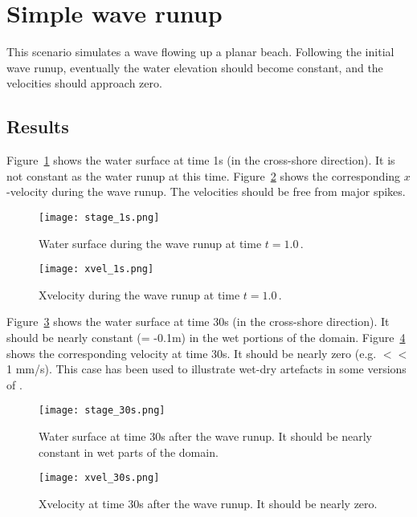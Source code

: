 \section{Simple wave runup}
This scenario simulates a wave flowing up a planar beach. Following the initial wave runup, eventually the water elevation should become constant, and the velocities should approach zero. 

\subsection{Results}
Figure~\ref{fig:stage_1s} shows the water surface at time 1s (in the cross-shore direction). It is not constant as the water runup at this time. Figure~\ref{fig:xvel_1s} shows the corresponding $x$-velocity during the wave runup. The velocities should be free from major spikes.
\begin{figure}[h]
\begin{center}
\texttt{[image: stage\_1s.png]}
\caption{Water surface during the wave runup at time $t=1.0$\,.}
\label{fig:stage_1s}
\end{center}
\end{figure}

\begin{figure}[h]
\begin{center}
\texttt{[image: xvel\_1s.png]}
\caption{Xvelocity during the wave runup at time $t=1.0$\,.}
\label{fig:xvel_1s}
\end{center}
\end{figure}



Figure~\ref{fig:stage_30s} shows the water surface at time 30s (in the cross-shore direction). It should be nearly constant (= -0.1m) in the wet portions of the domain. Figure~\ref{fig:xvel_30s} shows the corresponding velocity at time 30s. It should be nearly zero (e.g. $<<$ 1 mm/s). This case has been used to illustrate wet-dry artefacts in some versions of \anuga.
\begin{figure}[h]
\begin{center}
\texttt{[image: stage\_30s.png]}
\caption{Water surface at time 30s after the wave runup. It should be nearly constant in wet parts of the domain.}
\label{fig:stage_30s}
\end{center}
\end{figure}

\begin{figure}[h]
\begin{center}
\texttt{[image: xvel\_30s.png]}
\caption{Xvelocity at time 30s after the wave runup. It should be nearly zero.}
\label{fig:xvel_30s}
\end{center}
\end{figure}

\endinput